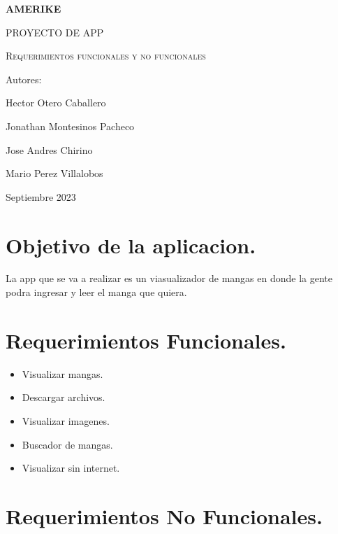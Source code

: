 \documentclass[12pt]{article}
\begin{document}
\begin{titlepage}
\centering
{\bfseries\LARGE AMERIKE \par}
\vspace{1cm}
{\scshape\Large PROYECTO DE APP \par}
\vspace{3cm}
{\scshape\Huge Requerimientos funcionales y no funcionales \par}
\vspace{3cm}
\vfill
{\Large Autores: \par}
{\Large Hector Otero Caballero \par}
{\Large Jonathan Montesinos Pacheco\par}
{\Large Jose Andres Chirino \par}
{\Large Mario Perez Villalobos\par}
\vfill
{\Large Septiembre 2023 \par}
\end{titlepage}

\newpage

\section*{}

\tableofcontents

\newpage

\section{Objetivo de la aplicacion.}

\par La app que se va a realizar es un viasualizador de mangas en donde la gente podra ingresar y leer el manga que quiera.

\section{Requerimientos Funcionales.}

\begin{itemize}
	\item Visualizar mangas.
	\item Descargar archivos.
	\item Visualizar imagenes.
	\item Buscador de mangas.
	\item Visualizar sin internet.
\end{itemize}

\section{Requerimientos No Funcionales.}
\end{document}
